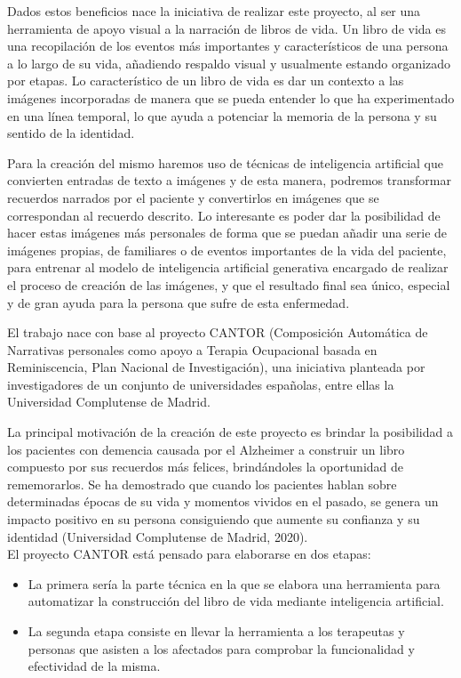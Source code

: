 Dados estos beneficios nace la iniciativa de realizar este proyecto, al ser una herramienta de apoyo visual a la narración de libros de vida. Un libro de vida es una recopilación de los eventos más importantes y característicos de una persona a lo largo de su vida, añadiendo respaldo visual y usualmente estando organizado por etapas. Lo característico de un libro de vida es dar un contexto a las imágenes incorporadas de manera que se pueda entender lo que ha experimentado en una línea temporal, lo que ayuda a potenciar la memoria de la persona y su sentido de la identidad. 

Para la creación del mismo haremos uso de técnicas de inteligencia artificial que convierten entradas de texto a imágenes y de esta manera, podremos transformar recuerdos narrados por el paciente y convertirlos en imágenes que se correspondan al recuerdo descrito. Lo interesante es poder dar la posibilidad de hacer estas imágenes más personales de forma que se puedan añadir una serie de imágenes propias, de familiares o de eventos importantes de la vida del paciente, para entrenar al modelo de inteligencia artificial generativa encargado de realizar el proceso de creación de las imágenes, y que el resultado final sea único, especial y de gran ayuda para la persona que sufre de esta enfermedad. 

El trabajo nace con base al proyecto CANTOR (Composición Automática de Narrativas personales como apoyo a Terapia Ocupacional basada en Reminiscencia, Plan Nacional de Investigación), una iniciativa planteada por investigadores de un conjunto de universidades españolas, entre ellas la Universidad Complutense de Madrid.

La principal motivación de la creación de este proyecto es brindar la posibilidad a los pacientes con demencia causada por el Alzheimer a construir un libro compuesto por sus recuerdos más felices, brindándoles la oportunidad de rememorarlos. Se ha demostrado que cuando los pacientes hablan sobre determinadas épocas de su vida y momentos vividos en el pasado, se genera un impacto positivo en su persona consiguiendo que aumente su confianza y su identidad (Universidad Complutense de Madrid, 2020).\\

El proyecto CANTOR está pensado para elaborarse en dos etapas: 
\begin{itemize}
	\item La primera sería la parte técnica en la que se elabora una herramienta para automatizar la construcción del libro de vida mediante inteligencia artificial. 
	\item La segunda etapa consiste en llevar la herramienta a los terapeutas y personas que asisten a los afectados para comprobar la funcionalidad y efectividad de la misma. 
\end{itemize}

